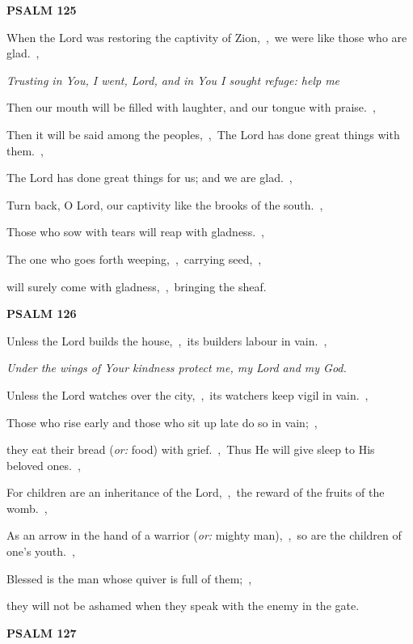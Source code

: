 \documentclass[12pt,twoside,a5paper]{article}
\newcommand{\psalm}[1]{\textbf{PSALM {#1}}\nopagebreak}
\newcommand{\qanona}[1]{{\liturgicalhint{Qanona.} \emph{#1}}}
\newcommand{\translationoption}[1]{\emph{or:} #1}
\begin{document}
\psalm{125}

\begin{normalparskip}
  When the Lord was restoring the captivity of Zion,~\sep\ we were like those who are glad.~\sep

  \qanona{Trusting in You, I went, Lord, and in You I sought refuge: help me}

  Then our mouth will be filled with laughter, and our tongue with praise.~\sep

  Then it will be said among the peoples,~\sep\ The Lord has done great things with them.~\sep

  The Lord has done great things for us; and we are glad.~\sep

  Turn back, O Lord, our captivity like the brooks of the south.~\sep

  Those who sow with tears will reap with gladness.~\sep

  The one who goes forth weeping,~\sep\ carrying seed,~\sep

  will surely come with gladness,~\sep\ bringing the sheaf.
\end{normalparskip}

\psalm{126}

\begin{normalparskip}
  Unless the Lord builds the house,~\sep\ its builders labour in vain.~\sep

  \qanona{Under the wings of Your kindness protect me, my Lord and my God.}

  Unless the Lord watches over the city,~\sep\ its watchers keep vigil in vain.~\sep

  Those who rise early and those who sit up late do so in vain;~\sep

  they eat their bread (\translationoption{food}) with grief.~\sep\ Thus He will give sleep to His beloved ones.~\sep

  For children are an inheritance of the Lord,~\sep\ the reward of the fruits of the womb.~\sep

  As an arrow in the hand of a warrior (\translationoption{mighty man}),~\sep\ so are the children of one's youth.~\sep

  Blessed is the man whose quiver is full of them;~\sep

  they will not be ashamed when they speak with the enemy in the gate.
\end{normalparskip}

\psalm{127}
\end{document}
